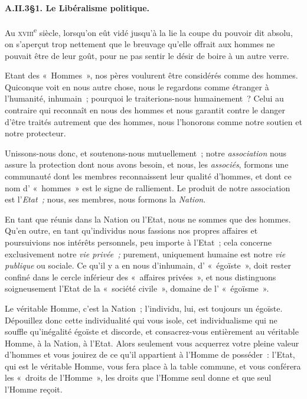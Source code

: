 \documentclass[french,twoside]{book} %
\begin{document}
\paragraph[{A.II.3§1. Le Libéralisme politique.}]{A.II.3§1. Le Libéralisme politique.}
\noindent Au {\scshape xviii}\textsuperscript{e} siècle, lorsqu’on eût vidé jusqu’à la lie la coupe du pouvoir dit absolu, on s’aperçut trop nettement que le breuvage qu’elle offrait aux hommes ne pouvait être de leur goût, pour ne pas sentir le désir de boire à un autre verre.\par
Etant des « Hommes », nos pères voulurent être considérés comme des hommes. Quiconque voit en nous autre chose, nous le regardons comme étranger à l’humanité, inhumain ; pourquoi le traiterions-nous humainement ? Celui au contraire qui reconnaît en nous des hommes et nous garantit contre le danger d’être traités autrement que des hommes, nous l’honorons comme notre soutien et notre protecteur.\par
Unissons-nous donc, et soutenons-nous mutuellement ; notre \emph{association} nous assure la protection dont nous avons besoin, et nous, les \emph{associés}, formons une communauté dont les membres reconnaissent leur qualité d’hommes, et dont ce nom d’ « hommes » est le signe de ralliement. Le produit de notre association est l’\emph{Etat ;} nous, ses membres, nous formons la \emph{Nation}.\par
En tant que réunis dans la Nation ou l’Etat, nous ne sommes que des hommes. Qu’en outre, en tant  qu’individus nous fassions nos propres affaires et poursuivions nos intérêts personnels, peu importe à l’Etat ; cela concerne exclusivement notre \emph{vie privée ; }purement, uniquement humaine est notre \emph{vie publique} ou sociale. Ce qu’il y a en nous d’inhumain, d’ « égoïste », doit rester confiné dans le cercle inférieur des « affaires privées », et nous distinguons soigneusement l’Etat de la « société civile », domaine de l’ « égoïsme ».\par
Le véritable Homme, c’est la Nation ; l’individu, lui, est toujours un égoïste. Dépouillez donc cette individualité qui vous isole, cet individualisme qui ne souffle qu’inégalité égoïste et discorde, et consacrez-vous entièrement au véritable Homme, à la Nation, à l’Etat. Alors seulement vous acquerrez votre pleine valeur d’hommes et vous jouirez de ce qu’il appartient à l’Homme de posséder : l’Etat, qui est le véritable Homme, vous fera place à la table commune, et vous conférera les « droits de l’Homme », les droits que l’Homme seul donne et que seul l’Homme reçoit.\par
\end{document}
